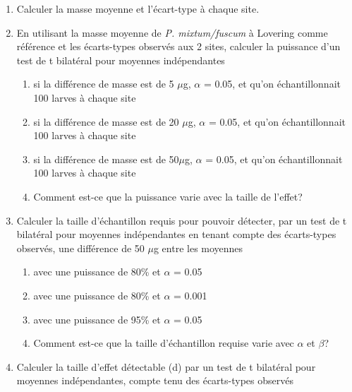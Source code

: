 \documentclass[12pt,]{book}
\providecommand{\tightlist}{%
  \setlength{\itemsep}{0pt}\setlength{\parskip}{0pt}}
\begin{document}
\begin{enumerate}
\def\labelenumi{\arabic{enumi}.}
\tightlist
\item
  Calculer la masse moyenne et l'écart-type à chaque site.
\item
  En utilisant la masse moyenne de \emph{P. mixtum/fuscum} à Lovering comme référence et les écarts-types observés aux 2 sites, calculer la puissance d'un test de t bilatéral pour moyennes indépendantes

  \begin{enumerate}
  \def\labelenumii{\alph{enumii})}
  \tightlist
  \item
    si la différence de masse est de 5 \(\mu\)g, \(\alpha\) = 0.05, et qu'on échantillonnait 100 larves à chaque site
  \item
    si la différence de masse est de 20 \(\mu\)g, \(\alpha\) = 0.05, et qu'on échantillonnait 100 larves à chaque site
  \item
    si la différence de masse est de 50\(\mu\)g, \(\alpha\) = 0.05, et qu'on échantillonnait 100 larves à chaque site
  \item
    Comment est-ce que la puissance varie avec la taille de l'effet?
  \end{enumerate}
\item
  Calculer la taille d'échantillon requis pour pouvoir détecter, par un test de t bilatéral pour moyennes indépendantes en tenant compte des écarts-types observés, une différence de 50 \(\mu\)g entre les moyennes

  \begin{enumerate}
  \def\labelenumii{\alph{enumii})}
  \tightlist
  \item
    avec une puissance de 80\% et \(\alpha\) = 0.05
  \item
    avec une puissance de 80\% et \(\alpha\) = 0.001
  \item
    avec une puissance de 95\% et \(\alpha\) = 0.05
  \item
    Comment est-ce que la taille d'échantillon requise varie avec \(\alpha\) et \(\beta\)?
  \end{enumerate}
\item
  Calculer la taille d'effet détectable (d) par un test de t bilatéral pour moyennes indépendantes, compte tenu des écarts-types observés


\end{enumerate}
\end{document}
